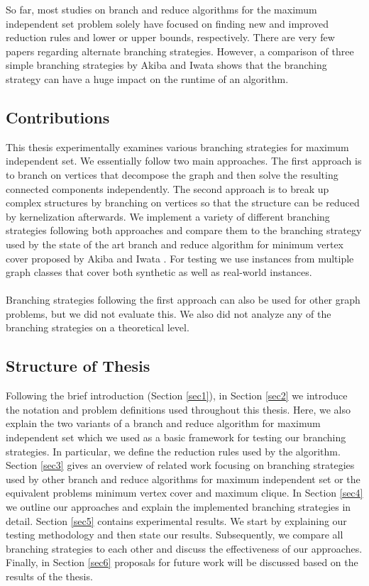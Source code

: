 \documentclass[12pt,a4paper,twoside]{scrartcl}
\numberwithin{equation}{section}
\begin{document}
So far, most studies on branch and reduce algorithms for the maximum independent set problem solely have focused on finding new and improved reduction rules and lower or upper bounds, respectively. There are very few papers regarding alternate branching strategies. However, a comparison of three simple branching strategies by Akiba and Iwata \cite{AkibaIwata} shows that the branching strategy can have a huge impact on the runtime of an algorithm.

\subsection{Contributions}

This thesis experimentally examines various branching strategies for maximum independent set. We essentially follow two main approaches. The first approach is to branch on vertices that decompose the graph and then solve the resulting connected components independently. The second approach is to break up complex structures by branching on vertices so that the structure can be reduced by kernelization afterwards. We implement a variety of different branching strategies following both approaches and compare them to the branching strategy used by the state of the art branch and reduce algorithm for minimum vertex cover proposed by Akiba and Iwata \cite{AkibaIwata}. For testing we use instances from multiple graph classes that cover both synthetic as well as real-world instances.\paragraph{}
Branching strategies following the first approach can also be used for other graph problems, but we did not evaluate this. We also did not analyze any of the branching strategies on a theoretical level.  



\subsection{Structure of Thesis}

Following the brief introduction (Section \ref{sec1}), in Section \ref{sec2} we introduce the notation and problem definitions used throughout this thesis. Here, we also explain the two variants of a branch and reduce algorithm for maximum independent set which we used as a basic framework for testing our branching strategies. In particular, we define the reduction rules used by the algorithm.\\
Section \ref{sec3} gives an overview of related work focusing on branching strategies used by other branch and reduce algorithms for maximum independent set or the equivalent problems minimum vertex cover and maximum clique.
In Section \ref{sec4} we outline our approaches and explain the implemented branching strategies in detail. Section \ref{sec5} contains experimental results. We start by explaining our testing methodology and then state our results. Subsequently, we compare all branching strategies to each other and discuss the effectiveness of our approaches. Finally, in Section \ref{sec6} proposals for future work will be discussed based on the results of the thesis.
\end{document}
